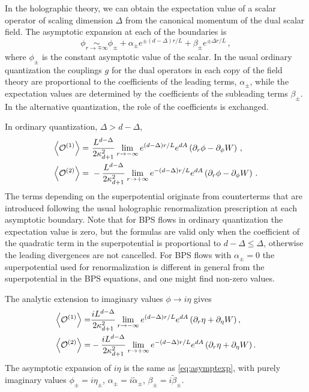 In the holographic theory, we can obtain the expectation value of a scalar operator of scaling dimension $\Delta$ from the canonical momentum of the dual scalar field.
The asymptotic expansion at each of the boundaries is
\begin{equation}\label{eq:asymptexp}
	\phi\underset{r\to \mp\infty}{\sim} \phi_\pm+\alpha_\pm e^{\pm(d-\Delta) r/L}+\beta_\pm e^{\pm \Delta r/L}\,,
\end{equation}
where $\phi_\pm$ is the constant asymptotic value of the scalar.
In the usual ordinary quantization the couplings $g$ for the dual operators in each copy of the field theory are proportional to the coefficients of the leading terms, $\alpha_\pm$, while the expectation values are determined by the coefficients of the subleading terms $\beta_\pm$.
In the alternative quantization, the role of the coefficients is exchanged.

In ordinary quantization, $\Delta>d-\Delta$,
\begin{equation}\label{eq:vevordquant}
\begin{split}
	\vev{\cO^{(1)}}=&\ \frac{L^{d-\Delta}}{2\kappa^2_{d+1}}\lim_{r\to -\infty} e^{(d-\Delta)r/L}e^{dA}\left(\partial_r\phi-\partial_\phi W\right)\,,\\
	\vev{\cO^{(2)}}=&\ -\frac{L^{d-\Delta}}{2\kappa^2_{d+1}}\lim_{r\to +\infty} e^{-(d-\Delta)r/L}e^{dA}\left(\partial_r\phi-\partial_\phi W\right)\,.
\end{split}
\end{equation}
The terms depending on the superpotential originate from counterterms that are introduced following the usual holographic renormalization prescription at each asymptotic boundary.
Note that for BPS flows in ordinary quantization the expectation value is zero, but the formulas are valid only when the coefficient of the quadratic term in the superpotential is proportional to $d-\Delta\leq \Delta$, otherwise the leading divergences are not cancelled.
For BPS flows with $\alpha_\pm=0$ the superpotential used for renormalization is different in general from the superpotential in the BPS equations, and one might find non-zero values. 

The analytic extension to imaginary values $\phi\to i\eta$ gives
\begin{equation}\label{eq:vevordquantIm}
\begin{split}
	\left\langle{\mathcal{O}^{(1)}}\right\rangle=&\frac{iL^{d-\Delta}}{2\kappa^2_{d+1}}\lim_{r\to -\infty} e^{(d-\Delta)r/L}e^{dA}\left(\partial_r\eta+\partial_\eta W\right),\\
	\left\langle{\mathcal{O}^{(2)}}\right\rangle=&-\frac{iL^{d-\Delta}}{2\kappa^2_{d+1}}\lim_{r\to +\infty} e^{-(d-\Delta)r/L}e^{dA}\left(\partial_r\eta+\partial_\eta W\right).
\end{split}
\end{equation}
The asymptotic expansion of $i\eta$ is the same as \cref{eq:asymptexp}, with purely imaginary values $\phi_\pm=i \eta_\pm$, $\alpha_\pm=i \tilde\alpha_\pm$, $\beta_\pm=i\tilde\beta_\pm$.

